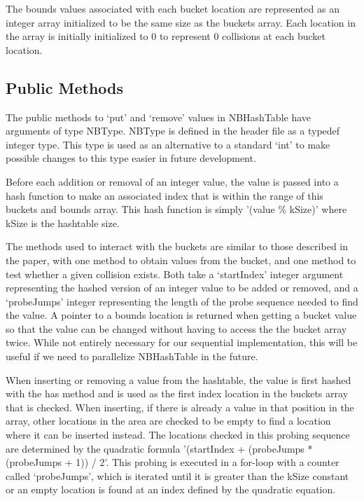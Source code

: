 \documentclass[journal]{IEEEtran}
\begin{document}
The bounds values associated with each bucket location are represented as an integer array initialized to be the same size as the buckets array. Each location in the array is initially initialized to 0 to represent 0 collisions at each bucket location.

\subsection{Public Methods}
The public methods to ‘put’ and ‘remove’ values in NBHashTable have arguments of type NBType. NBType is defined in the header file as a typedef integer type. This type is used as an alternative to a standard ‘int’ to make possible changes to this type easier in future development.

Before each addition or removal of an integer value, the value is passed into a hash function to make an associated index that is within the range of this buckets and bounds array. This hash function is simply '(value \% kSize)' where kSize is the hashtable size.

The methods used to interact with the buckets are similar to those described in the paper, with one method to obtain values from the bucket, and one method to test whether a given collision exists. Both take a ‘startIndex’ integer argument representing the hashed version of an integer value to be added or removed, and a ‘probeJumps’ integer representing the length of the probe sequence needed to find the value. A pointer to a bounds location is returned when getting a bucket value so that the value can be changed without having to access the the bucket array twice. While not entirely necessary for our sequential implementation, this will be useful if we need to parallelize NBHashTable in the future.

When inserting or removing a value from the hashtable, the value is first hashed with the has method and is used as the first index location in the buckets array that is checked. When inserting, if there is already a value in that position in the array, other locations in the area are checked to be empty to find a location where it can be inserted instead. The locations checked in this probing sequence are determined by the quadratic formula '(startIndex + (probeJumps * (probeJumps + 1)) / 2'. This probing is executed in a for-loop with a counter called ‘probeJumps’, which is iterated until it is greater than the kSize constant or an empty location is found at an index defined by the quadratic equation.
\end{document}

